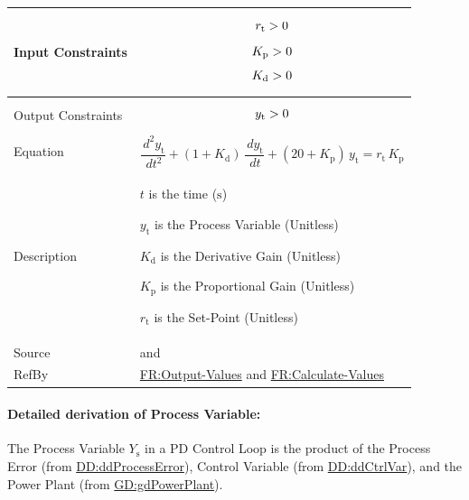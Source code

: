 \documentclass[12pt]{article}
\newcommand{\gt}{\ensuremath >}
\begin{document}
\begin{minipage}{\textwidth}
\begin{tabular}{>{\raggedright}p{}>{\raggedright\arraybackslash}p{}}
\\ \midrule
Input Constraints & \begin{displaymath}
                    {r_{\text{t}}}\gt{}0
                    \end{displaymath}
                    \begin{displaymath}
                    {K_{\text{p}}}\gt{}0
                    \end{displaymath}
                    \begin{displaymath}
                    {K_{\text{d}}}\gt{}0
                    \end{displaymath}
\\ \midrule
Output Constraints & \begin{displaymath}
                     {y_{\text{t}}}\gt{}0
                     \end{displaymath}
\\ \midrule
Equation & \begin{displaymath}
           \frac{\,d^{2}{y_{\text{t}}}}{\,dt^{2}}+\left(1+{K_{\text{d}}}\right)\,\frac{\,d{y_{\text{t}}}}{\,dt}+\left(20+{K_{\text{p}}}\right)\,{{y_{\text{t}}}}={r_{\text{t}}}\,{K_{\text{p}}}
           \end{displaymath}
\\ \midrule
Description & \begin{symbDescription}
              \item{$t$ is the time (${\text{s}}$)}
              \item{${y_{\text{t}}}$ is the Process Variable (Unitless)}
              \item{${K_{\text{d}}}$ is the Derivative Gain (Unitless)}
              \item{${K_{\text{p}}}$ is the Proportional Gain (Unitless)}
              \item{${r_{\text{t}}}$ is the Set-Point (Unitless)}
              \end{symbDescription}
\\ \midrule
Source & \cite{abbasi2015} and \cite{johnson2008}
         
\\ \midrule
RefBy & \hyperref[outputValues]{FR:Output-Values} and \hyperref[calculateValues]{FR:Calculate-Values}
        
\\ \bottomrule
\end{tabular}
\end{minipage}

\paragraph{Detailed derivation of Process Variable:}
\label{IM:pdEquationIMDeriv}
The Process Variable ${Y_{\text{s}}}$ in a PD Control Loop is the product of the Process Error (from \hyperref[DD:ddProcessError]{DD:ddProcessError}), Control Variable (from \hyperref[DD:ddCtrlVar]{DD:ddCtrlVar}), and the Power Plant (from \hyperref[GD:gdPowerPlant]{GD:gdPowerPlant}).
\end{document}
